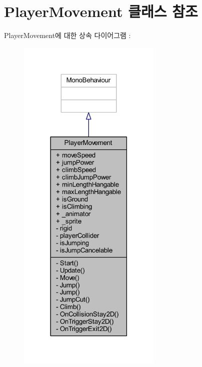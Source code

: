 \hypertarget{class_player_movement}{}\section{Player\+Movement 클래스 참조}
\label{class_player_movement}


Player\+Movement에 대한 상속 다이어그램 \+: \nopagebreak
\begin{figure}[H]
\begin{center}
\leavevmode
\includegraphics[width=194pt]{de/d46/class_player_movement__inherit__graph}
\end{center}
\end{figure}


